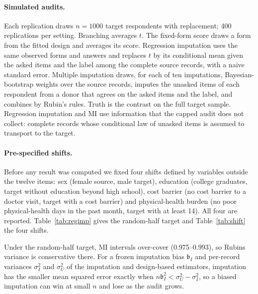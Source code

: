\paragraph{Simulated audits.}
Each replication draws $n=1000$ target respondents with replacement; 400 replications per setting. Branching averages $t$. The fixed-form score draws a form from the fitted design and averages its score. Regression imputation uses the same observed forms and answers and replaces $t$ by its conditional mean given the asked items and the label among the complete source records, with a naive standard error. Multiple imputation draws, for each of ten imputations, Bayesian-bootstrap weights over the source records, imputes the unasked items of each respondent from a donor that agrees on the asked items and the label, and combines by Rubin's rules. Truth is the contrast on the full target sample. Regression imputation and MI use information that the capped audit does not collect: complete records whose conditional law of unasked items is assumed to transport to the target.

\paragraph{Pre-specified shifts.}
Before any result was computed we fixed four shifts defined by variables outside the twelve items: sex (female source, male target), education (college graduates, target without education beyond high school), cost barrier (no cost barrier to a doctor visit, target with a cost barrier) and physical-health burden (no poor physical-health days in the past month, target with at least 14). All four are reported. Table~\ref{tab:regimp} gives the random-half target and Table~\ref{tab:shift} the four shifts.



Under the random-half target, MI intervals over-cover (0.975--0.993), so Rubin\textquotesingle s variance is conservative there. For a frozen imputation bias $\mathfrak b_I$ and per-record variances $\sigma_I^2$ and $\sigma_U^2$ of the imputation and design-based estimators, imputation has the smaller mean squared error exactly when $n\mathfrak b_I^2<\sigma_U^2-\sigma_I^2$, so a biased imputation can win at small $n$ and lose as the audit grows.

